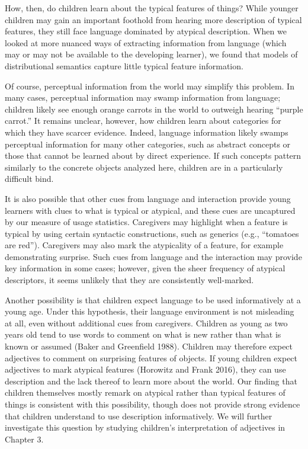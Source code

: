 \documentclass{ucetd}
\begin{document}
How, then, do children learn about the typical features of things? While
younger children may gain an important foothold from hearing more
description of typical features, they still face language dominated by
atypical description. When we looked at more nuanced ways of extracting
information from language (which may or may not be available to the
developing learner), we found that models of distributional semantics
capture little typical feature information.

Of course, perceptual information from the world may simplify this
problem. In many cases, perceptual information may swamp information
from language; children likely see enough orange carrots in the world to
outweigh hearing ``purple carrot.'' It remains unclear, however, how
children learn about categories for which they have scarcer evidence.
Indeed, language information likely swamps perceptual information for
many other categories, such as abstract concepts or those that cannot be
learned about by direct experience. If such concepts pattern similarly
to the concrete objects analyzed here, children are in a particularly
difficult bind.

It is also possible that other cues from language and interaction
provide young learners with clues to what is typical or atypical, and
these cues are uncaptured by our measure of usage statistics. Caregivers
may highlight when a feature is typical by using certain syntactic
constructions, such as generics (e.g., ``tomatoes are red''). Caregivers
may also mark the atypicality of a feature, for example demonstrating
surprise. Such cues from language and the interaction may provide key
information in some cases; however, given the sheer frequency of
atypical descriptors, it seems unlikely that they are consistently
well-marked.

Another possibility is that children expect language to be used
informatively at a young age. Under this hypothesis, their language
environment is not misleading at all, even without additional cues from
caregivers. Children as young as two years old tend to use words to
comment on what is new rather than what is known or assumed (Baker and
Greenfield 1988). Children may therefore expect adjectives to comment on
surprising features of objects. If young children expect adjectives to
mark atypical features (Horowitz and Frank 2016), they can use
description and the lack thereof to learn more about the world. Our
finding that children themselves mostly remark on atypical rather than
typical features of things is consistent with this possibility, though
does not provide strong evidence that children understand to use
description informatively. We will further investigate this question by
studying children's interpretation of adjectives in Chapter 3.
\end{document}
